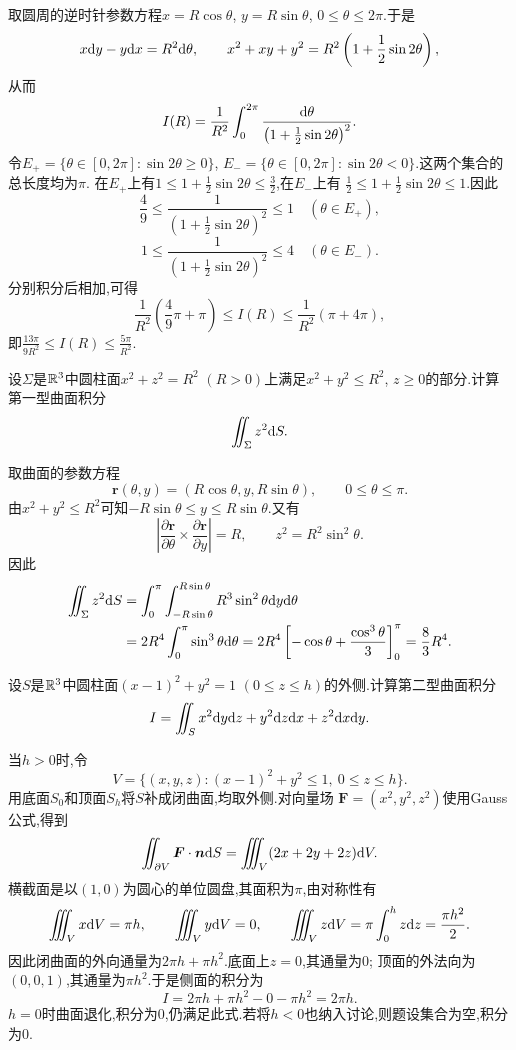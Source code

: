 \documentclass{ctexart}
\begin{document}
\begin{solution}
取圆周的逆时针参数方程$x=R\cos\theta$, $y=R\sin\theta$, $0\leqslant\theta\leqslant2\pi$.于是
\[x\mathrm{d} y-y\mathrm{d} x=R^2\mathrm{d}\theta,\qquad
x^2+xy+y^2=R^2\left(1+\frac12\sin2\theta\right),\]
从而
\[I(R)=\frac1{R^2}\int_0^{2\pi}\frac{\mathrm{d}\theta}{\left(1+\frac12\sin2\theta\right)^2}.\]
令$E_+=\{\theta\in[0,2\pi]:\sin2\theta\geqslant0\}$,
$E_-=\{\theta\in[0,2\pi]:\sin2\theta<0\}$.这两个集合的总长度均为$\pi$.
在$E_+$上有$1\leqslant1+\frac12\sin2\theta\leqslant\frac32$,在$E_-$上有
$\frac12\leqslant1+\frac12\sin2\theta\leqslant1$.因此
\[\frac49\leqslant\frac1{\left(1+\frac12\sin2\theta\right)^2}\leqslant1
\quad(\theta\in E_+),\]
\[1\leqslant\frac1{\left(1+\frac12\sin2\theta\right)^2}\leqslant4
\quad(\theta\in E_-).\]
分别积分后相加,可得
\[\frac1{R^2}\left(\frac49\pi+\pi\right)
\leqslant I(R)\leqslant\frac1{R^2}(\pi+4\pi),\]
即$\displaystyle\frac{13\pi}{9R^2}\leqslant I(R)\leqslant\frac{5\pi}{R^2}$.
\end{solution}
\begin{problem}[4.(15\songti{分})]
设$\Sigma$是$\mathbb{R}^3$中圆柱面$x^2+z^2=R^2$ $(R>0)$上满足$x^2+y^2\leqslant R^2$, $z\geqslant0$的部分.计算第一型曲面积分
    \[\iint_\Sigma z^2\mathrm{d} S.\]
\end{problem}
\begin{solution}
取曲面的参数方程
\[\boldsymbol r(\theta,y)=(R\cos\theta,y,R\sin\theta),\qquad0\leqslant\theta\leqslant\pi.\]
由$x^2+y^2\leqslant R^2$可知$-R\sin\theta\leqslant y\leqslant R\sin\theta$.又有
\[\left|\frac{\partial\boldsymbol r}{\partial\theta}\times
\frac{\partial\boldsymbol r}{\partial y}\right|=R,\qquad z^2=R^2\sin^2\theta.\]
因此
\[\begin{aligned}
\iint_\Sigma z^2\mathrm{d} S
&=\int_0^\pi\int_{-R\sin\theta}^{R\sin\theta}R^3\sin^2\theta\mathrm{d} y\mathrm{d}\theta\\
&=2R^4\int_0^\pi\sin^3\theta\mathrm{d}\theta
=2R^4\left[-\cos\theta+\frac{\cos^3\theta}{3}\right]_0^\pi
=\frac83R^4.
\end{aligned}\]
\end{solution}
\begin{problem}[5.(15\songti{分})]
设$S$是$\mathbb{R}^3$中圆柱面$(x-1)^2+y^2=1$ $(0\leqslant z\leqslant h)$的外侧.计算第二型曲面积分
    \[I=\iint_Sx^2\mathrm{d} y\mathrm{d} z+y^2\mathrm{d} z\mathrm{d} x+z^2\mathrm{d} x\mathrm{d} y.\]
\end{problem}
\begin{solution}
当$h>0$时,令
\[V=\{(x,y,z):(x-1)^2+y^2\leqslant1,\ 0\leqslant z\leqslant h\}.\]
用底面$S_0$和顶面$S_h$将$S$补成闭曲面,均取外侧.对向量场
$\boldsymbol F=(x^2,y^2,z^2)$使用Gauss公式,得到
\[\iint_{\partial V}\boldsymbol F\cdot\boldsymbol n\mathrm{d} S
=\iiint_V(2x+2y+2z)\mathrm{d} V.\]
横截面是以$(1,0)$为圆心的单位圆盘,其面积为$\pi$,由对称性有
\[\iiint_Vx\mathrm{d} V=\pi h,\qquad\iiint_Vy\mathrm{d} V=0,\qquad
\iiint_Vz\mathrm{d} V=\pi\int_0^hz\mathrm{d} z=\frac{\pi h^2}{2}.\]
因此闭曲面的外向通量为$2\pi h+\pi h^2$.底面上$z=0$,其通量为$0$;
顶面的外法向为$(0,0,1)$,其通量为$\pi h^2$.于是侧面的积分为
\[I=2\pi h+\pi h^2-0-\pi h^2=2\pi h.\]
$h=0$时曲面退化,积分为$0$,仍满足此式.若将$h<0$也纳入讨论,则题设集合为空,积分为$0$.
\end{solution}
\end{document}
